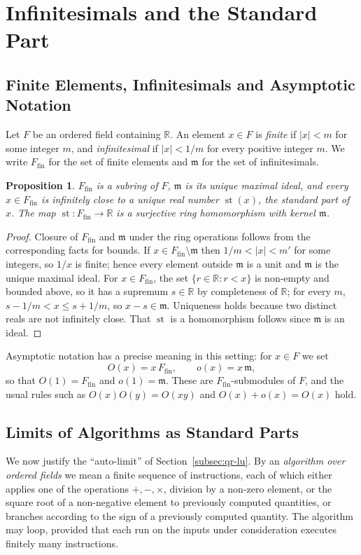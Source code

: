 \documentclass[12pt, a4paper]{report}
\theoremstyle{plain}
\newtheorem{proposition}[theorem]{Proposition}
\theoremstyle{definition}
\theoremstyle{remark}
\theoremstyle{plain}
\newcommand{\RR}{\mathbb{R}}
\newcommand{\st}{\operatorname{st}}
\begin{document}
\section{Infinitesimals and the Standard Part}
\label{sec:standard-part}

\subsection{Finite Elements, Infinitesimals and Asymptotic Notation}
Let $F$ be an ordered field containing $\RR$. An element $x\in F$ is \emph{finite} if $|x|<m$ for some integer $m$, and \emph{infinitesimal} if $|x|<1/m$ for every positive integer $m$. We write $F_{\mathrm{fin}}$ for the set of finite elements and $\mathfrak m$ for the set of infinitesimals.

\begin{proposition}\label{prop:standard-part}
$F_{\mathrm{fin}}$ is a subring of $F$, $\mathfrak m$ is its unique maximal ideal, and every $x\in F_{\mathrm{fin}}$ is infinitely close to a unique real number $\st(x)$, the \emph{standard part} of $x$. The map $\st:F_{\mathrm{fin}}\to\RR$ is a surjective ring homomorphism with kernel $\mathfrak m$.
\end{proposition}
\begin{proof}
Closure of $F_{\mathrm{fin}}$ and $\mathfrak m$ under the ring operations follows from the corresponding facts for bounds. If $x\in F_{\mathrm{fin}}\setminus\mathfrak m$ then $1/m<|x|<m'$ for some integers, so $1/x$ is finite; hence every element outside $\mathfrak m$ is a unit and $\mathfrak m$ is the unique maximal ideal. For $x\in F_{\mathrm{fin}}$, the set $\{r\in\RR:r<x\}$ is non-empty and bounded above, so it has a supremum $s\in\RR$ by completeness of $\RR$; for every $m$, $s-1/m<x\leq s+1/m$, so $x-s\in\mathfrak m$. Uniqueness holds because two distinct reals are not infinitely close. That $\st$ is a homomorphism follows since $\mathfrak m$ is an ideal.
\end{proof}

Asymptotic notation has a precise meaning in this setting: for $x\in F$ we set
\[ O(x)=x\,F_{\mathrm{fin}},\qquad o(x)=x\,\mathfrak m, \]
so that $O(1)=F_{\mathrm{fin}}$ and $o(1)=\mathfrak m$. These are $F_{\mathrm{fin}}$-submodules of $F$, and the usual rules such as $O(x)O(y)=O(xy)$ and $O(x)+o(x)=O(x)$ hold.

\subsection{Limits of Algorithms as Standard Parts}
We now justify the ``auto-limit'' of Section~\ref{subsec:qr-lu}. By an \emph{algorithm over ordered fields} we mean a finite sequence of instructions, each of which either applies one of the operations $+,-,\times$, division by a non-zero element, or the square root of a non-negative element to previously computed quantities, or branches according to the sign of a previously computed quantity. The algorithm may loop, provided that each run on the inputs under consideration executes finitely many instructions.
\end{document}
